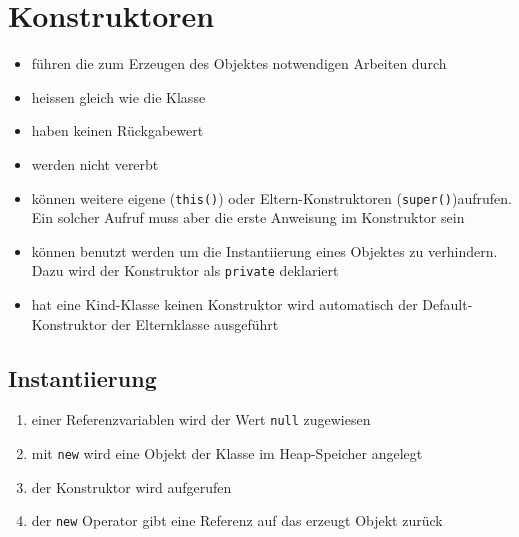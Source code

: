 \section{Konstruktoren}
\begin{itemize}\itemsep0em
	\item führen die zum Erzeugen des Objektes notwendigen Arbeiten durch
	\item heissen gleich wie die Klasse
	\item haben keinen Rückgabewert
	\item werden nicht vererbt
	\item können weitere eigene (\texttt{this()}) oder Eltern-Konstruktoren (\texttt{super()})aufrufen. Ein solcher Aufruf muss aber die erste Anweisung im Konstruktor sein
	\item können benutzt werden um die Instantiierung eines Objektes zu verhindern.
	Dazu wird der Konstruktor als \texttt{private} deklariert
	\item hat eine Kind-Klasse keinen Konstruktor wird automatisch der Default-Konstruktor der Elternklasse ausgeführt
\end{itemize}

\subsection{Instantiierung}
\begin{enumerate}\itemsep0em
	\item einer Referenzvariablen wird der Wert \texttt{null} zugewiesen
	\item mit \texttt{new} wird eine Objekt der Klasse im Heap-Speicher angelegt
	\item der Konstruktor wird aufgerufen
	\item der \texttt{new} Operator gibt eine Referenz auf das erzeugt Objekt zurück
\end{enumerate}
